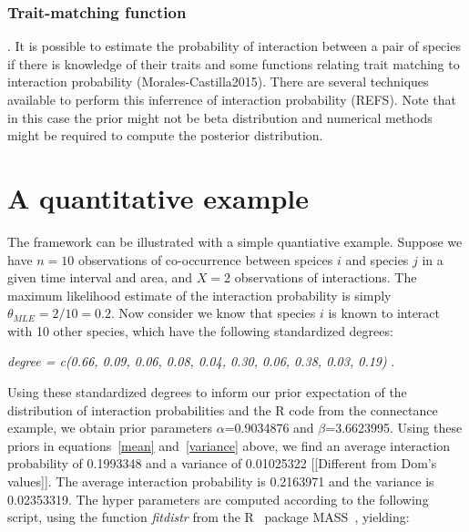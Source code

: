 \documentclass[12pt]{article}
\begin{document}
  \subsubsection*{Trait-matching function}. 
  It is possible to estimate the probability of interaction between a pair of species if there is knowledge of their traits and some functions relating trait matching to interaction probability (Morales-Castilla2015). There are several techniques available to perform this inferrence of interaction probability (REFS). Note that in this case the prior might not be beta distribution and numerical methods might be required to compute the posterior distribution.  

\section*{A quantitative example}
The framework can be illustrated with a simple quantiative example. Suppose we have $n = 10$ observations of co-occurrence between speices $i$ and species $j$ in a given time interval and area, and $X = 2$ observations of interactions. The maximum likelihood estimate of the interaction probability is simply $\theta_{MLE} = 2/10 = 0.2$. 
 Now consider we know that species $i$ is known to interact with 10 other species, which have the following standardized degrees:

\vspace{12pt}
\noindent\emph{
    degree = c(0.66, 0.09, 0.06, 0.08, 0.04, 0.30, 0.06, 0.38, 0.03, 0.19)
    }.
  \vspace{12pt}

Using these standardized degrees to inform our prior expectation of the 
distribution of interaction probabilities and the R code from the 
connectance example, we obtain prior parameters $\alpha$=0.9034876 
and $\beta$=3.6623995. Using these priors in equations~\ref{mean} 
and~\ref{variance} above, we find an average interaction probability of 0.1993348 and a variance of 0.01025322 [[Different from Dom's values]].
The average interaction probability is 0.2163971 and the variance is 0.02353319. The hyper parameters are computed according to the following script, using the function \emph{fitdistr} from the R~\citep{R} package MASS~\citep{MASS}, yielding:
\end{document}

